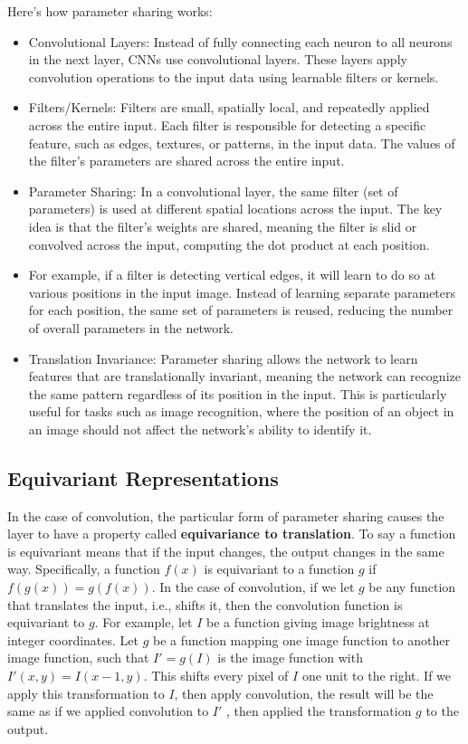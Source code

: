 \documentclass{report}
\begin{document}
Here's how parameter sharing works:
\begin{itemize}
	\item Convolutional Layers: Instead of fully connecting each neuron to all neurons in the next layer, CNNs use convolutional layers. These layers apply convolution operations to the input data using learnable filters or kernels.

	\item Filters/Kernels: Filters are small, spatially local, and repeatedly applied across the entire input. Each filter is responsible for detecting a specific feature, such as edges, textures, or patterns, in the input data. The values of the filter's parameters are shared across the entire input.

	\item Parameter Sharing: In a convolutional layer, the same filter (set of parameters) is used at different spatial locations across the input. The key idea is that the filter's weights are shared, meaning the filter is slid or convolved across the input, computing the dot product at each position.

	\item For example, if a filter is detecting vertical edges, it will learn to do so at various positions in the input image. Instead of learning separate parameters for each position, the same set of parameters is reused, reducing the number of overall parameters in the network.

	\item Translation Invariance: Parameter sharing allows the network to learn features that are translationally invariant, meaning the network can recognize the same pattern regardless of its position in the input. This is particularly useful for tasks such as image recognition, where the position of an object in an image should not affect the network's ability to identify it.
\end{itemize}

\subsection{Equivariant Representations}
In the case of convolution, the particular form of parameter sharing causes the layer to have a property called \textbf{equivariance to translation}. To say a function is equivariant means that if the input changes, the output changes in the same way. Speciﬁcally, a function $f(x)$ is equivariant to a function $g$ if $f(g(x)) = g(f (x))$. In the case of convolution, if we let $g$ be any function that translates the input, i.e., shifts it, then the convolution function is equivariant to $g$. For example, let $I$ be a function giving image brightness at integer coordinates. Let $g$ be a function mapping one image function to another image function, such that $I' = g(I)$ is the image function with $I' (x, y) = I(x - 1, y)$. This shifts every pixel of $I$ one unit to the right. If we apply this transformation to $I$, then apply convolution, the result will be the same as if we applied convolution to $I'$ , then applied the transformation $g$ to the output.
\end{document}
